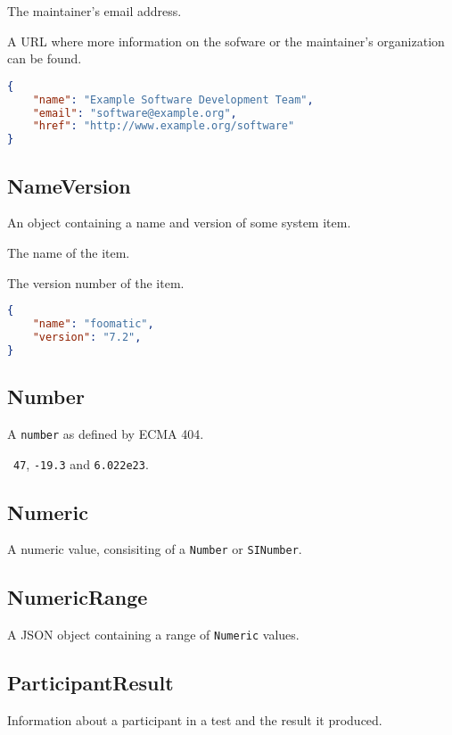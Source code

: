 \documentclass[10pt]{article}
\begin{document}
 The maintainer's email address.

 A URL where more information on the sofware or
the maintainer's organization can be found.

\example
\begin{lstlisting}[language=json]
{
    "name": "Example Software Development Team",
    "email": "software@example.org",
    "href": "http://www.example.org/software"
}
\end{lstlisting}



\subsection{NameVersion}

An object containing a name and version of some system item.

 The name of the item.

 The version number of the item.

\example
\begin{lstlisting}[language=json]
{
    "name": "foomatic",
    "version": "7.2",
}
\end{lstlisting}



\subsection{Number}
A {\tt number} as defined by ECMA 404.

\example\ {\tt 47}, {\tt -19.3} and {\tt 6.022e23}.


\subsection{Numeric}
A numeric value, consisiting of a {\tt Number} or {\tt SINumber}.

\subsection{NumericRange}
A JSON object containing a range of {\tt Numeric} values.




\subsection{ParticipantResult}
Information about a participant in a test and the result it produced.
\end{document}
